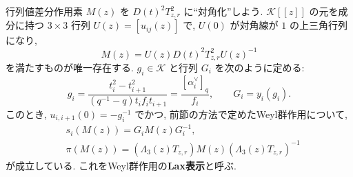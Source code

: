 \documentclass[12pt,twoside,dvipdfm]{msjproc}
\theoremstyle{definition} %
\theoremstyle{definition} %
\theoremstyle{definition} %
\numberwithin{theorem}{section}
\numberwithin{equation}{section}
\numberwithin{figure}{section}
\numberwithin{table}{section}
\newcommand\K{\mathcal{K}}
\newcommand\av{\alpha^\vee}
\begin{document}
行列値差分作用素 $M(z)$ を $D(t)^2T_{z,r}^2$ に``対角化''しよう.
$\K[[z]]$ の元を成分に持つ $3\times 3$ 行列 $U(z)=[u_{ij}(z)]$ で, 
$U(0)$ が対角線が $1$ の上三角行列になり, 
\begin{equation*}
  M(z) = U(z)D(t)^2T_{z,r}^2U(z)^{-1}
\end{equation*}
を満たすものが唯一存在する.
$g_i\in\K$ と行列 $G_i$ を次のように定める:
\begin{equation*}
 g_i 
 = \frac{t_i^2-t_{i+1}^2}{(q^{-1}-q)t_if_it_{i+1}} 
 = \frac{[\av_i]_q}{f_i}, \qquad
 G_i = y_i(g_i).
\end{equation*}
このとき, $u_{i,i+1}(0) =  -g_i^{-1}$ でかつ, 
前節の方法で定めたWeyl群作用について,
\begin{align*}
 &
 s_i(M(z)) = G_i M(z) G_i^{-1},
 \\ &
 \pi(M(z)) = (\Lambda_3(z)T_{z,r})M(z)(\Lambda_3(z)T_{z,r})^{-1}
\end{align*}
が成立している.  これをWeyl群作用の{\bf Lax表示}と呼ぶ.
\end{document}
